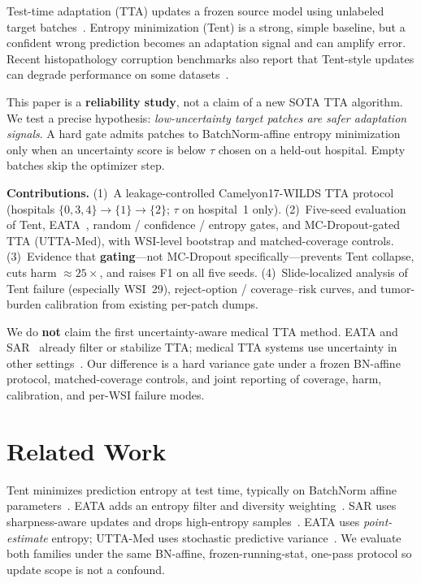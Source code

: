 \documentclass[conference]{IEEEtran}
\begin{document}
Test-time adaptation (TTA) updates a frozen source model using unlabeled target batches~\cite{wang2021tent,liang2023comprehensive}.
Entropy minimization (Tent) is a strong, simple baseline, but a confident wrong prediction becomes an adaptation signal and can amplify error.
Recent histopathology corruption benchmarks also report that Tent-style updates can degrade performance on some datasets~\cite{histopathc2026}.

This paper is a \textbf{reliability study}, not a claim of a new SOTA TTA algorithm.
We test a precise hypothesis: \emph{low-uncertainty target patches are safer adaptation signals}.
A hard gate admits patches to BatchNorm-affine entropy minimization only when an uncertainty score is below $\tau$ chosen on a held-out hospital.
Empty batches skip the optimizer step.

\textbf{Contributions.}
(1)~A leakage-controlled Camelyon17-WILDS TTA protocol (hospitals $\{0,3,4\}\to\{1\}\to\{2\}$; $\tau$ on hospital~1 only).
(2)~Five-seed evaluation of Tent, EATA~\cite{niu2022eata}, random / confidence / entropy gates, and MC-Dropout-gated TTA (UTTA-Med), with WSI-level bootstrap and matched-coverage controls.
(3)~Evidence that \textbf{gating}---not MC-Dropout specifically---prevents Tent collapse, cuts harm ${\approx}25{\times}$, and raises F1 on all five seeds.
(4)~Slide-localized analysis of Tent failure (especially WSI~29), reject-option / coverage--risk curves, and tumor-burden calibration from existing per-patch dumps.

We do \textbf{not} claim the first uncertainty-aware medical TTA method.
EATA and SAR~\cite{niu2023sar} already filter or stabilize TTA; medical TTA systems use uncertainty in other settings~\cite{certaintta2025,uadfm2025,sictta2026}.
Our difference is a hard variance gate under a frozen BN-affine protocol, matched-coverage controls, and joint reporting of coverage, harm, calibration, and per-WSI failure modes.

\section{Related Work}
Tent minimizes prediction entropy at test time, typically on BatchNorm affine parameters~\cite{wang2021tent}.
EATA adds an entropy filter and diversity weighting~\cite{niu2022eata}.
SAR uses sharpness-aware updates and drops high-entropy samples~\cite{niu2023sar}.
EATA uses \emph{point-estimate} entropy; UTTA-Med uses stochastic predictive variance~\cite{gal2016dropout}.
We evaluate both families under the same BN-affine, frozen-running-stat, one-pass protocol so update scope is not a confound.
\end{document}
